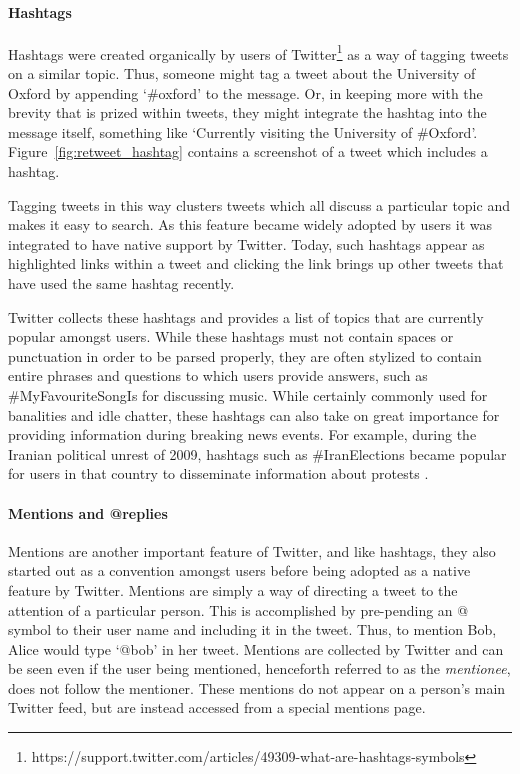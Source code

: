 \paragraph{Hashtags}

Hashtags were created organically by users of Twitter\footnote{https://support.twitter.com/articles/49309-what-are-hashtags-symbols} as a way of tagging tweets on a similar topic. Thus, someone might tag a tweet about the University of Oxford by appending `\#oxford' to the message. Or, in keeping more with the brevity that is prized within tweets, they might integrate the hashtag into the message itself, something like `Currently visiting the University of \#Oxford'. Figure~\ref{fig:retweet_hashtag} contains a screenshot of a tweet which includes a hashtag.

Tagging tweets in this way clusters tweets which all discuss a particular topic and makes it easy to search. As this feature became widely adopted by users it was integrated to have native support by Twitter. Today, such hashtags appear as highlighted links within a tweet and clicking the link brings up other tweets that have used the same hashtag recently.

Twitter collects these hashtags and provides a list of topics that are currently popular amongst users. While these hashtags must not contain spaces or punctuation in order to be parsed properly, they are often stylized to contain entire phrases and questions to which users provide answers, such as \#MyFavouriteSongIs for discussing music. While certainly commonly used for banalities and idle chatter, these hashtags can also take on great importance for providing information during breaking news events. For example, during the Iranian political unrest of 2009, hashtags such as \#IranElections became popular for users in that country to disseminate information about protests \cite{Cha2010}.


\paragraph{Mentions and @replies}

Mentions are another important feature of Twitter, and like hashtags, they also started out as a convention amongst users before being adopted as a native feature by Twitter\cite{Java2007}. Mentions are simply a way of directing a tweet to the attention of a particular person. This is accomplished by pre-pending an @ symbol to their user name and including it in the tweet. Thus, to mention Bob, Alice would type `@bob' in her tweet. Mentions are collected by Twitter and can be seen even if the user being mentioned, henceforth referred to as the \emph{mentionee}, does not follow the mentioner. These mentions do not appear on a person's main Twitter feed, but are instead accessed from a special mentions page.

